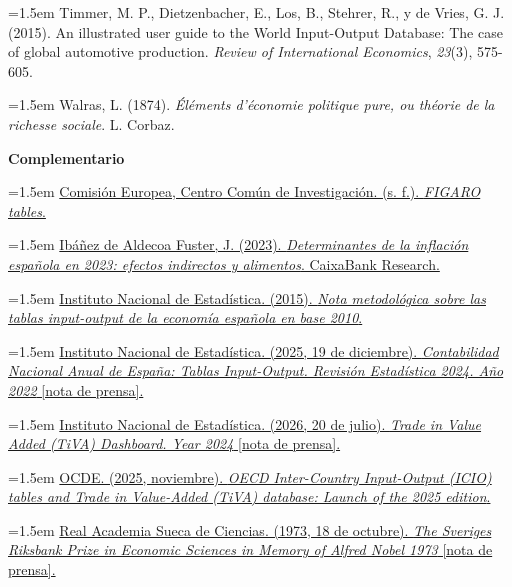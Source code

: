 \documentclass[10pt,a4paper]{article}
\begin{document}
\noindent\hangindent=1.5em Timmer, M. P., Dietzenbacher, E., Los, B., Stehrer, R., y de Vries, G. J. (2015). An illustrated user guide to the World Input-Output Database: The case of global automotive production. \textit{Review of International Economics}, \textit{23}(3), 575-605.

\noindent\hangindent=1.5em Walras, L. (1874). \textit{Éléments d'économie politique pure, ou théorie de la richesse sociale}. L. Corbaz.

\textbf{Complementario}

\noindent\hangindent=1.5em \href{https://joint-research-centre.ec.europa.eu/figaro-tables_en}{Comisión Europea, Centro Común de Investigación. (s. f.). \textit{FIGARO tables}.}

\noindent\hangindent=1.5em \href{https://www.caixabankresearch.com/es/node/11342/printable/print}{Ibáñez de Aldecoa Fuster, J. (2023). \textit{Determinantes de la inflación española en 2023: efectos indirectos y alimentos}. CaixaBank Research.}

\noindent\hangindent=1.5em \href{https://www.ine.es/daco/daco42/cne10/meto_tio_10.pdf}{Instituto Nacional de Estadística. (2015). \textit{Nota metodológica sobre las tablas input-output de la economía española en base 2010}.}

\noindent\hangindent=1.5em \href{https://www.ine.es/dyngs/Prensa/TIO2022.htm}{Instituto Nacional de Estadística. (2025, 19 de diciembre). \textit{Contabilidad Nacional Anual de España: Tablas Input-Output. Revisión Estadística 2024. Año 2022} [nota de prensa].}

\noindent\hangindent=1.5em \href{https://ine.es/dyngs/Prensa/en/TiVA2024.htm}{Instituto Nacional de Estadística. (2026, 20 de julio). \textit{Trade in Value Added (TiVA) Dashboard. Year 2024} [nota de prensa].}

\noindent\hangindent=1.5em \href{https://www.oecd.org/en/blogs/2025/11/oecd-inter-country-input-output-icio-tables-and-trade-in-value-added-tiva-database-launch-of-the-2025-edition.html}{OCDE. (2025, noviembre). \textit{OECD Inter-Country Input-Output (ICIO) tables and Trade in Value-Added (TiVA) database: Launch of the 2025 edition}.}

\noindent\hangindent=1.5em \href{https://www.nobelprize.org/prizes/economic-sciences/1973/press-release/}{Real Academia Sueca de Ciencias. (1973, 18 de octubre). \textit{The Sveriges Riksbank Prize in Economic Sciences in Memory of Alfred Nobel 1973} [nota de prensa].}
\end{document}
